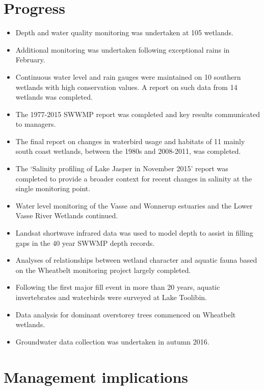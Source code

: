 \documentclass[version=last,
    paper=a4, %
    10pt, %
    usenames,
    dvipsnames,
    oneside, %
    headings=openany, %
    DIV=15 %
]{scrbook}
\begin{document}
\section*{Progress}

\begin{itemize}
\itemsep1pt\parskip0pt
\item
  Depth and water quality monitoring was undertaken at 105 wetlands.
\item
  Additional monitoring was undertaken following exceptional rains in
  February.
\item
  Continuous water level and rain gauges were maintained on 10 southern
  wetlands with high conservation values. A report on such data from 14
  wetlands was completed.
\item
  The 1977-2015 SWWMP report was completed and key results communicated
  to managers.
\item
  The final report on changes in waterbird usage and habitats of 11
  mainly south coast wetlands, between the 1980s and 2008-2011, was
  completed.
\item
  The `Salinity profiling of Lake Jasper in November 2015' report was
  completed to provide a broader context for recent changes in salinity
  at the single monitoring point.
\item
  Water level monitoring of the Vasse and Wonnerup estuaries and the
  Lower Vasse River Wetlands continued.
\item
  Landsat shortwave infrared data was used to model depth to assist in
  filling gaps in the 40 year SWWMP depth records.
\item
  Analyses of relationships between wetland character and aquatic fauna
  based on the Wheatbelt monitoring project largely completed.
\item
  Following the first major fill event in more than 20 years, aquatic
  invertebrates and waterbirds were surveyed at Lake Toolibin.
\item
  Data analysis for dominant overstorey trees commenced on Wheatbelt
  wetlands.
\item
  Groundwater data collection was undertaken in autumn 2016.
\end{itemize}




\section*{Management implications}
\end{document}
